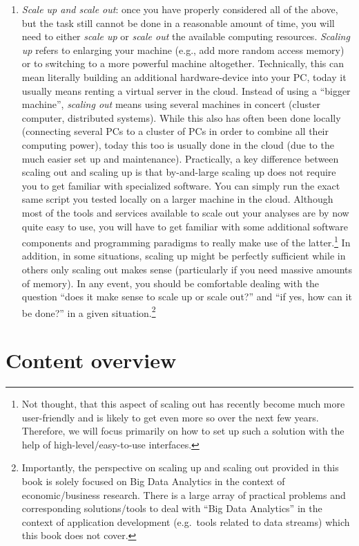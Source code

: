 \documentclass[
  12pt,
]{style/krantz}
\begin{document}
\begin{enumerate}
\item
  \emph{Scale up and scale out}: once you have properly considered all of the above, but the task still cannot be done in a reasonable amount of time, you will need to either \emph{scale up} or \emph{scale out} the available computing resources. \emph{Scaling up} refers to enlarging your machine (e.g., add more random access memory) or to switching to a more powerful machine altogether. Technically, this can mean literally building an additional hardware-device into your PC, today it usually means renting a virtual server in the cloud. Instead of using a ``bigger machine'', \emph{scaling out} means using several machines in concert (cluster computer, distributed systems). While this also has often been done locally (connecting several PCs to a cluster of PCs in order to combine all their computing power), today this too is usually done in the cloud (due to the much easier set up and maintenance). Practically, a key difference between scaling out and scaling up is that by-and-large scaling up does not require you to get familiar with specialized software. You can simply run the exact same script you tested locally on a larger machine in the cloud. Although most of the tools and services available to scale out your analyses are by now quite easy to use, you will have to get familiar with some additional software components and programming paradigms to really make use of the latter.\footnote{Not thought, that this aspect of scaling out has recently become much more user-friendly and is likely to get even more so over the next few years. Therefore, we will focus primarily on how to set up such a solution with the help of high-level/easy-to-use interfaces.} In addition, in some situations, scaling up might be perfectly sufficient while in others only scaling out makes sense (particularly if you need massive amounts of memory). In any event, you should be comfortable dealing with the question ``does it make sense to scale up or scale out?'' and ``if yes, how can it be done?'' in a given situation.\footnote{Importantly, the perspective on scaling up and scaling out provided in this book is solely focused on Big Data Analytics in the context of economic/business research. There is a large array of practical problems and corresponding solutions/tools to deal with ``Big Data Analytics'' in the context of application development (e.g.~tools related to data streams) which this book does not cover.}
\end{enumerate}

\hypertarget{content-overview}{%
\section{Content overview}\label{content-overview}}
\end{document}
